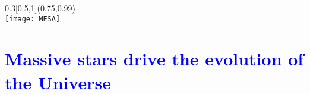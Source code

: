 \documentclass[xcolor=dvipsnames,professionalfonts, aspectratio=169]{beamer}
\begin{document}
\begin{frame}
{  }

  \begin{textblock}{0.3}[0.5,1](0.75,0.99)
    \centering
    \small
    \color{gray!50}{\tiny Simulation output from}\\
    \texttt{[image: MESA]}
  \end{textblock}
\end{frame}





\AtBeginSection[]{}
\section*{\textcolor{Blue}{Massive stars drive the evolution of the Universe}}


\bgroup
{}
\end{document}
